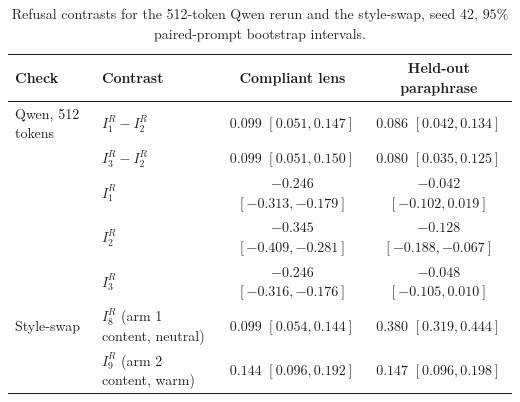 \begin{table}[htb]
  \centering
  \footnotesize
  \caption{Refusal contrasts for the 512-token Qwen rerun and the style-swap, seed 42, $95\%$ paired-prompt bootstrap intervals.}
  \label{tab:qwen-swap}
  \begin{tabular}{@{}llcc@{}}
    \toprule
    Check & Contrast & Compliant lens & Held-out paraphrase \\
    \midrule
    Qwen, 512 tokens & $I_1^R-I_2^R$ & $0.099$ $[0.051, 0.147]$ & $0.086$ $[0.042, 0.134]$ \\
     & $I_3^R-I_2^R$ & $0.099$ $[0.051, 0.150]$ & $0.080$ $[0.035, 0.125]$ \\
     & $I_1^R$ & $-0.246$ $[-0.313, -0.179]$ & $-0.042$ $[-0.102, 0.019]$ \\
     & $I_2^R$ & $-0.345$ $[-0.409, -0.281]$ & $-0.128$ $[-0.188, -0.067]$ \\
     & $I_3^R$ & $-0.246$ $[-0.316, -0.176]$ & $-0.048$ $[-0.105, 0.010]$ \\
    \addlinespace
    Style-swap & $I_8^R$ (arm 1 content, neutral) & $0.099$ $[0.054, 0.144]$ & $0.380$ $[0.319, 0.444]$ \\
     & $I_9^R$ (arm 2 content, warm) & $0.144$ $[0.096, 0.192]$ & $0.147$ $[0.096, 0.198]$ \\
    \bottomrule
  \end{tabular}
\end{table}
